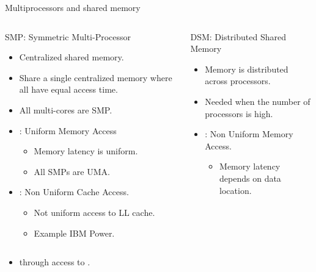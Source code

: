 \begin{frame}[t,shrink=10]{Multiprocessors and shared memory}

\vspace{-1em}
\begin{columns}[T]


\begin{block}{SMP: Symmetric Multi-Processor}
\begin{itemize}
  \item Centralized shared memory.
  \item Share a single centralized memory where all have equal access time.
  \item All multi-cores are SMP.
  \item {}: Uniform Memory Access
    \begin{itemize}
      \item Memory latency is uniform.
      \item All SMPs are UMA.
    \end{itemize}
  \item {}: Non Uniform Cache Access.
    \begin{itemize}
      \item Not uniform access to LL cache.
      \item Example IBM Power.
    \end{itemize} 
\end{itemize}
\end{block}

\pause
{}

\begin{block}{DSM: Distributed Shared Memory}
\begin{itemize}
  \item Memory is distributed across processors.
  \item Needed when the number of processors is high.
  \item {}: Non Uniform Memory Access.
    \begin{itemize}
      \item Memory latency depends on data location.
    \end{itemize}
\end{itemize}
\end{block}

\end{columns}


\begin{itemize}
  \item {} through access to .
\end{itemize}
\end{frame}

